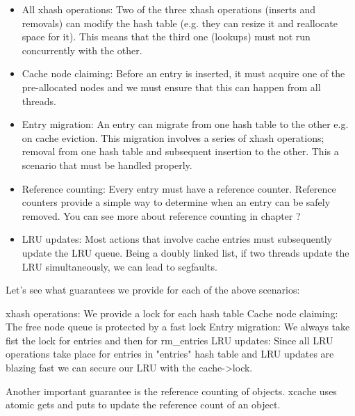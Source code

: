 \begin{itemize}
	\item All xhash operations: Two of the three xhash operations (inserts and 
		removals) can modify the hash table (e.g. they can resize it and 
		reallocate space for it). This means that the third one (lookups) must 
		not run concurrently with the other.
	\item Cache node claiming: Before an entry is inserted, it must	acquire one 
		of the pre-allocated nodes and we must ensure that this can happen from 
		all threads.
	\item Entry migration: An entry can migrate from one hash table to the other 
		e.g. on cache eviction. This migration involves a series of xhash 
		operations; removal from one hash table and subsequent insertion to the 
		other. This a scenario that must be handled properly.
	\item Reference counting: Every entry must have a reference counter.  
		Reference counters provide a simple way to determine when an entry can 
		be safely removed. You can see more about reference counting in chapter 
		?
	\item LRU updates: Most actions that involve cache entries must subsequently 
		update the LRU queue. Being a doubly linked list, if two threads update 
		the LRU simultaneously, we can lead to segfaults.
\end{itemize}

Let's see what guarantees we provide for each of the above scenarios:

xhash operations: We provide a lock for each hash table
Cache node claiming: The free node queue is protected by a fast lock
Entry migration: We always take fist the lock for entries and then for 
rm\_entries
LRU updates: Since all LRU operations take place for entries in "entries" hash 
table and LRU updates are blazing fast we can secure our LRU with the 
cache->lock.

Another important guarantee is the reference counting of objects. xcache uses 
atomic gets and puts to update the reference count of an object.

